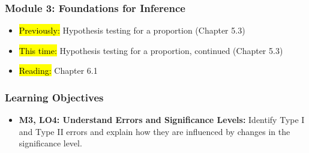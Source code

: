 
\begin{frame}
    \frametitle{Module 3: Foundations for Inference}
    \begin{itemize}
        \item \hl{Previously: }Hypothesis testing for a proportion (Chapter 5.3)
        \item \hl{This time: }Hypothesis testing for a proportion, continued (Chapter 5.3)
        \item \hl{Reading: }Chapter 6.1
    \end{itemize}

\end{frame}
\begin{frame}
    \frametitle{Learning Objectives}
    \begin{itemize}
        \item \textbf{M3, LO4: Understand Errors and Significance Levels:} Identify Type I and Type II errors and explain how they are influenced by changes in the significance level.
    \end{itemize}
\end{frame}
